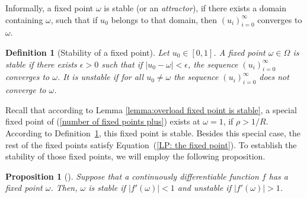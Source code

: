 \documentclass{IEEEtran}
\newtheorem{definition}{Definition}
\newtheorem{proposition}{Proposition}
\begin{document}
Informally, a fixed point $\omega$ is stable (or an  \emph{attractor}),  if there exists a domain containing $\omega$, such that if $u_0$ belongs to
that domain, then $(u_i)_{i=0}^{\infty}$ converges to $\omega$.
\begin{definition}[Stability of a fixed point] \label{def: stable fixed point}
Let $u_0 \in [0,1]$. A fixed point $\omega \in \Omega$ is \textit{stable} if there exists $\epsilon>0$ such that if $|u_0-\omega|< \epsilon$, the
sequence $(u_i)_{i=0}^{\infty}$ converges to $\omega$.
It is \textit{unstable} if for all $u_0 \neq \omega$ the sequence $(u_i)_{i=0}^{\infty}$ does not converge to $\omega$.
\end{definition}

Recall that according to Lemma \ref{lemma:overload fixed point is stable}, a special fixed point of (\ref{number of fixed points plus}) exists at
$\omega = 1$, if $\rho > 1/R$. According to Definition~\ref{def: stable fixed point}, this fixed point is stable.
Besides this special case, the rest of the fixed points satisfy Equation~(\ref{LP: the fixed point}).
To establish the stability of those fixed points, we will employ the following proposition.
\begin{proposition}[{\cite{lynch2004dynamical}}]\label{prop: stable fixed point}
Suppose that a continuously differentiable function $f$ has a fixed point $\omega$. Then, $\omega$ is stable if \mbox{$|f'(\omega)| < 1$} and
unstable if $|f'(\omega)| > 1$.
\end{proposition}
\end{document}
